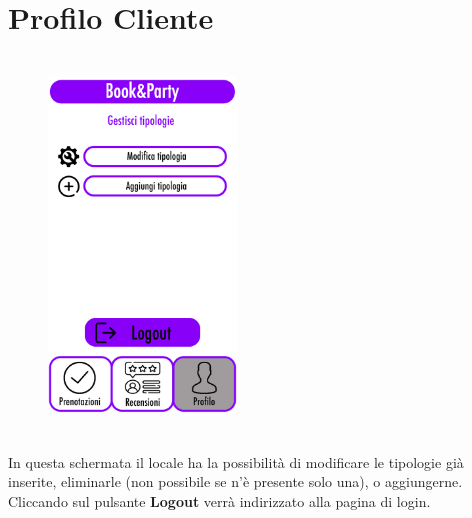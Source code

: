 \section{Profilo Cliente}
\begin{figure}[h]
    \centering
    \includegraphics[width=5cm, height=10cm]{mockup/10-profilo-locale.jpg}
    \label{fig:profioLocale}
\end{figure}

In questa schermata il locale ha la possibilità di modificare le tipologie già inserite, 
eliminarle (non possibile se n'è presente solo una), o aggiungerne.
Cliccando sul pulsante \textbf{Logout} verrà indirizzato alla pagina di login.

\newpage
